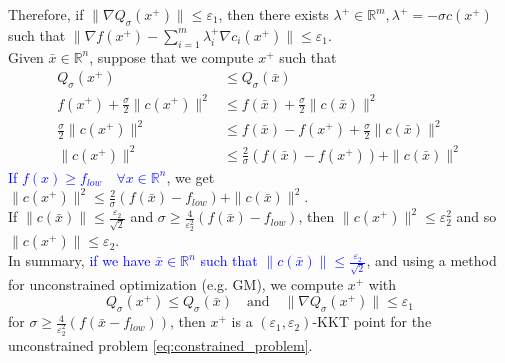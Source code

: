 \documentclass[12pt, openany]{report}
\newcommand{\R}{\mathbb{R}}
\theoremstyle{definition}
\begin{document}
Therefore, if $\| \nabla Q_{\sigma} (x^+) \| \leq \varepsilon_1$, then there exists $\lambda^+ \in \R^m, \lambda^+ = - \sigma c(x^+)$ such that $\|\nabla f(x^+) - \displaystyle \sum_{i=1}^{m} \lambda_i^+ \nabla c_i(x^+)\| \leq \varepsilon_1$.\\
Given $\bar{x} \in \R^n$, suppose that we compute $x^+$ such that
\begin{equation}
	\begin{aligned}
		Q_\sigma(x^+) &\leq Q_\sigma(\bar{x})\\
		f(x^+) + \frac{\sigma}{2} \|c(x^+)\|^2 &\leq f(\bar{x}) + \frac{\sigma}{2} \|c(\bar{x})\|^2\\
		\frac{\sigma}{2} \|c(x^+)\|^2 &\leq f(\bar{x}) - f(x^+) + \frac{\sigma}{2} \|c(\bar{x})\|^2\\
		\|c(x^+)\|^2 &\leq \frac{2}{\sigma} \left( f(\bar{x}) - f(x^+) \right) + \|c(\bar{x})\|^2
	\end{aligned}
\end{equation}
\textcolor{blue}{If $f(x) \geq f_{low} \quad \forall x \in \R^n$}, we get $\|c(x^+)\|^2 \leq \frac{2}{\sigma} (f(\bar{x}) - f_{low}) + \|c(\bar{x})\|^2$.\\
If $\|c(\bar{x})\| \leq \frac{\varepsilon_2}{\sqrt{2}}$ and $\sigma \geq \frac{4}{\varepsilon_2^2} (f(\bar{x})-f_{low})$, then $\|c(x^+)\|^2 \leq \varepsilon_2^2$ and so $\|c(x^+)\| \leq \varepsilon_2$.\\
In summary, \textcolor{blue}{if we have $\bar{x} \in \R^n$ such that $\|c(\bar{x})\| \leq \frac{\varepsilon_2}{\sqrt{2}}$}, and using a method for unconstrained optimization (e.g. GM), we compute $x^+$ with
\begin{equation}
	Q_\sigma(x^+) \leq Q_\sigma(\bar{x}) \quad \text{and} \quad \|\nabla Q_\sigma(x^+)\| \leq \varepsilon_1
\end{equation}
for $\sigma \geq \frac{4}{\varepsilon_2^2} (f(\bar{x}-f_{low}))$, then $x^+$ is a $(\varepsilon_1,\varepsilon_2)$-KKT point for the unconstrained problem \eqref{eq:constrained_problem}.\\
\newline
\end{document}
